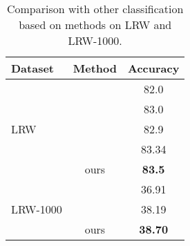\documentclass[a4paper, 10pt, conference]{ieeeconf}      \usepackage{FG2020}
\begin{document}
\vspace{-0.0cm}
\begin{table}[H]
	\setlength{\abovecaptionskip}{0.1cm}
	\caption{Comparison with other classification based on methods on LRW and LRW-1000.} \label{table6}
\centering
	\begin{tabular}{|p{1.39cm}|c|c|}    
		\hline
		Dataset & Method&  Accuracy \\
		\hline
		\hline
		\multirow{5}{*}{LRW}&\cite{Petridis2018}  & 82.0  \\
		~&\cite{Stafylakis2017} & 83.0 \\
		~&\cite{themos}&{82.9}  \\
		~&\cite{Wang2019}&{83.34}  \\
		~&ours& \textbf{83.5}  \\
		\hline
		\multirow{3}{*}{LRW-1000}& \cite{Wang2019}& {36.91}    \\  
		~&    \cite{Yang2019} & 38.19 \\
		~&ours  & \textbf{38.70}    \\
		
		\hline
	\end{tabular}
	
\end{table}
\end{document}
